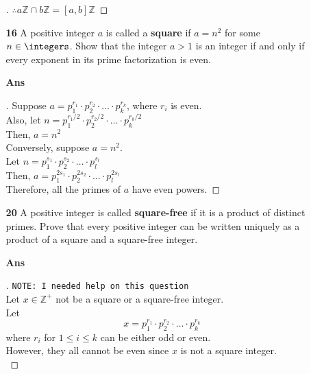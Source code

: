 \documentclass[paper=usletter, fontsize=12pt]{article}
\begin{document}
\begin{itemize}
\begin{itemize}
\begin{proof}[\unskip\nopunct]
                $\therefore a\mathbb{Z} \cap b\mathbb{Z} = [a,b]\mathbb{Z}$
                \qedhere
            \end{proof}
            \vspace{0.2in}

            \item[\textbf{16}] A positive integer $a$ is called a
            \textbf{square} if $a = n^2$ for some $n \in \integers$. Show that
            the integer $a > 1$ is an integer if and only if every exponent in
            its prime factorization is even.
            \item[\textbf{Ans}]
            \begin{proof}[\unskip\nopunct]
                Suppose $a = p_{1}^{r_{1}} \cdot p_{2}^{r_{2}} \cdot \ldots \cdot p_{k}^{r_{k}}$, where $r_{i}$ is even.\\
                Also, let $n = p_{1}^{r_{1}/2} \cdot p_{2}^{r_{2}/2} \cdot \ldots \cdot p_{k}^{r_{k}/2}$\\
                Then, $a = n^2$\\

                Conversely, suppose $a = n^2$.\\
                Let $n = p_{1}^{s_{1}} \cdot p_{2}^{s_{2}} \cdot \ldots \cdot p_{l}^{s_{l}}$\\
                Then, $a = p_{1}^{2s_{1}} \cdot p_{2}^{2s_{2}} \cdot \ldots \cdot p_{l}^{2s_{l}}$\\
                Therefore, all the primes of $a$ have even powers. \qedhere
            \end{proof}
            \vspace{0.2in}

            \item[\textbf{20}] A positive integer is called \textbf{square-free} if it is a product of distinct primes. Prove that every
            positive integer can be written uniquely as a product of a square
            and a square-free integer.
            \item[\textbf{Ans}]
            \begin{proof}[\unskip\nopunct]
                \texttt{\small NOTE: I needed help on this question}\\
                Let $x \in \mathbb{Z^{+}}$ not be a square or a square-free integer.\\
                Let
                \begin{equation*}
                    x = p_{1}^{r_1} \cdot p_{2}^{r_2} \cdot \ldots \cdot p_{k}^{r_k}
                \end{equation*}
                where $r_{i}$ for $1 \le i \le k$ can be either odd or even.\\
                However, they all cannot be even since $x$ is not a square integer.\\


\end{proof}
\end{itemize}
\end{itemize}
\end{document}
